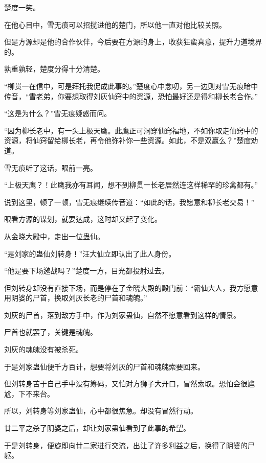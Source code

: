 
\begin{this_body}

楚度一笑。

在他心目中，雪无痕可以招揽进他的楚门，所以他一直对他比较关照。

但是方源却是他的合作伙伴，今后要在方源的身上，收获狂蛮真意，提升力道境界的。

孰重孰轻，楚度分得十分清楚。

“柳贯一在信中，可是拜托我促成此事的。”楚度心中念叨，另一边则对雪无痕暗中传音，“雪老弟，你要想取得刘灰仙窍中的资源，恐怕最好还是得和柳长老合作。”

“这是为什么？”雪无痕疑惑而问。

“因为柳长老中，有一头上极天鹰。此鹰正可洞穿仙窍福地，不如你取走仙窍中的资源，将仙窍留给柳长老，再令他弥补你一些资源。如此，不是双赢么？”楚度劝道。

雪无痕听了这话，眼前一亮。

“上极天鹰？！此鹰我亦有耳闻，想不到柳贯一长老居然连这样稀罕的珍禽都有。”

说到这里，顿了一顿，雪无痕继续传音道：“如此的话，我愿意和柳长老交易！”

眼看方源的谋划，就要达成，这时却又起了变化。

从金晓大殿中，走出一位蛊仙。

“是刘家的蛊仙刘转身！”汪大仙立即认出了此人身份。

“他是要下场邀战吗？”楚度一方，目光都投射过去。

但刘转身却没有直接下场，而是停在了金晓大殿的殿门前：“霸仙大人，我方愿意用阴婆的尸首，换取刘灰长老的尸首和魂魄。”

刘灰的尸首，落到敌方手中，作为刘家蛊仙，自然不愿意看到这样的情景。

尸首也就罢了，关键是魂魄。

刘灰的魂魄没有被杀死。

于是刘家蛊仙便千方百计，想要将刘灰的尸首和魂魄索要回来。

但刘转身苦于自己手中没有筹码，又怕对方狮子大开口，冒然索取。恐怕会很尴尬，下不来台。

所以，刘转身等刘家蛊仙，心中都很焦急。却没有冒然行动。

廿二平之杀了阴婆之后，却让刘家蛊仙看到了此事的希望。

于是刘转身，便旋即向廿二家进行交流，出让了许多利益之后，换得了阴婆的尸躯。


\end{this_body}
